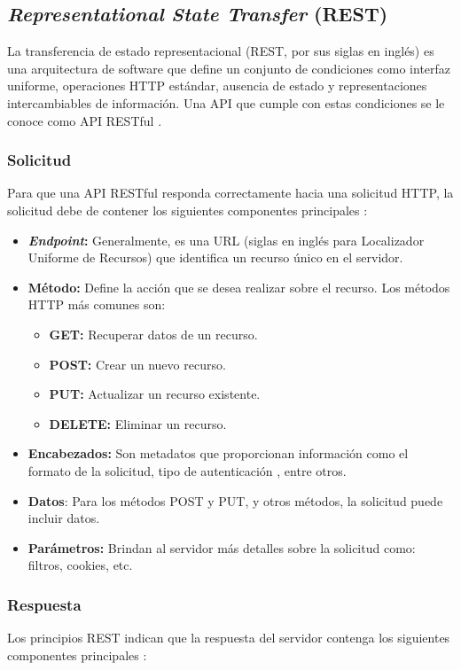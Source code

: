 \subsection{\textit{Representational State Transfer} (REST)}
La transferencia de estado representacional (REST, por sus siglas en inglés) es una arquitectura de software que define un
conjunto de condiciones como interfaz uniforme, operaciones HTTP estándar, ausencia de estado y representaciones intercambiables
de información. Una API que cumple con estas condiciones se le conoce como
API RESTful \cite{aws2025restfulAPI}.

\subsubsection{Solicitud}
Para que una API RESTful responda correctamente hacia una solicitud HTTP, la solicitud debe de contener los siguientes
componentes principales \cite{aws2025restfulAPI}:

\begin{itemize}
    \item \textbf{\textit{Endpoint}:} Generalmente, es una URL (siglas en inglés para Localizador Uniforme de Recursos) que
            identifica un recurso único en el servidor.
    \item \textbf{Método:} Define la acción que se desea realizar sobre el recurso. Los métodos HTTP más comunes son:
            \begin{itemize}
                \item \textbf{GET:} Recuperar datos de un recurso.
                \item \textbf{POST:} Crear un nuevo recurso.
                \item \textbf{PUT:} Actualizar un recurso existente.
                \item \textbf{DELETE:} Eliminar un recurso.
            \end{itemize}
    \item \textbf{Encabezados:} Son metadatos que proporcionan información como el formato de la solicitud, tipo de autenticación
            , entre otros.
    \item \textbf{Datos}: Para los métodos POST y PUT, y otros métodos, la solicitud puede incluir datos.
    \item \textbf{Parámetros:} Brindan al servidor más detalles sobre la solicitud como: filtros, cookies, etc.
\end{itemize}

\subsubsection{Respuesta}
Los principios REST indican que la respuesta del servidor contenga los siguientes componentes principales \cite{aws2025restfulAPI}:

